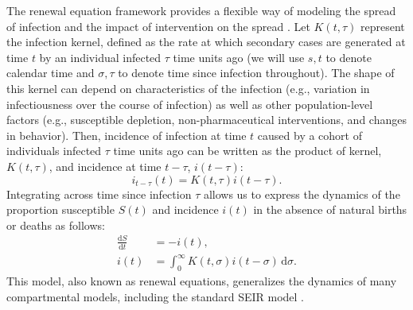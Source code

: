 \documentclass[12pt]{article}
\newcommand{\dd}[1]{\ensuremath{\, \mathrm{d}#1}}
\newcommand{\dsigma}{\dd{\sigma}}
\begin{document}
The renewal equation framework provides a flexible way of modeling the spread of infection and the impact of intervention on the spread \citep{fraser2007estimating}.
Let $K(t, \tau)$ represent the infection kernel, defined as the rate at which secondary cases are generated at time $t$ by an individual infected $\tau$ time units ago (we will use $s, t$ to denote calendar time and $\sigma, \tau$ to denote time since infection throughout).
The shape of this kernel can depend on characteristics of the infection (e.g., variation in infectiousness over the course of infection) as well as other population-level factors (e.g., susceptible depletion, non-pharmaceutical interventions, and changes in behavior).
Then, incidence of infection at time $t$ caused by a cohort of individuals infected $\tau$ time units ago can be written as the product of kernel, $K(t, \tau)$, and incidence at time $t-\tau$, $i(t-\tau)$:
\begin{equation}
i_{t-\tau}(t) = K(t, \tau) i(t-\tau).
\end{equation}
Integrating across time since infection $\tau$ allows us to express the dynamics of the proportion susceptible $S(t)$ and incidence $i(t)$ in the absence of natural births or deaths as follows: 
\begin{align}
\frac{\mathrm{d}S}{\mathrm{d}t} &= - i(t),\\
i(t) &= \int_0^\infty K(t, \sigma) i(t-\sigma) \dsigma.
\label{eq:renewal}
\end{align}
This model, also known as renewal equations, generalizes the dynamics of many compartmental models, including the standard SEIR model \citep{heesterbeek1996concept, diekmann2000mathematical, roberts2004modelling, aldis2005integral, roberts2007model, champredon2018equivalence}.
\end{document}
